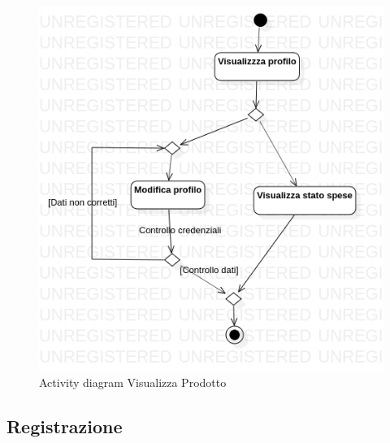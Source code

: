 \documentclass[12pt, a4paper]{report}
\begin{document}
\begin{figure}[h]
  \centering
  \includegraphics[width=\textwidth]{Use Case Model!Gestione profilo!Activity1!ActivityDiagramRegistrazione_6.png}
  \caption{Activity diagram Visualizza Prodotto}
\end{figure}

\newpage

\subsection{Registrazione}
\end{document}
